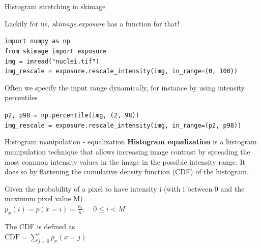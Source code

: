 \documentclass[9pt, aspectratio=169]{beamer}
\begin{document}
\begin{frame}
	{Histogram stretching in skimage}

	Luckily for us, \textit{skimage.exposure} has a function for that!

	{
		\begin{codebox}
			\texttt{import numpy as np\\
				from skimage import exposure\\
				img = imread("nuclei.tif")\\
				img\_rescale = exposure.rescale\_intensity(img, in\_range=(0, 100))
			}
		\end{codebox}

		\pause
		Often we specify the input range dynamically, for instance by using intensity percentiles

		\begin{codebox}
			\texttt{p2, p98 = np.percentile(img, (2, 98))\\
				img\_rescale = exposure.rescale\_intensity(img, in\_range=(p2, p98))}
		\end{codebox}
	}

\end{frame}
\begin{frame}
	{Histogram manipulation - equalization}
	\textbf{Histogram equalization} is a histogram manipulation technique that allows increasing image contrast by spreading the most common intensity values in the image in the possible intensity range.
	\pause
	It does so by flattening the cumulative density function (CDF) of the histogram.

	Given the probability of a pixel to have intensity i (with i between 0 and the maximum pixel value M)\\

	\huge
	$p_x(i) = p(x=i) = \frac{n_i}{n},\quad 0 \le i < M$
	\pause

	\normalsize
	\vspace{2em}
	The CDF is defined as\\

	\huge
	$\text{CDF} = \sum_{j=0}^i p_x(x=j)$
\end{frame}
\end{document}
